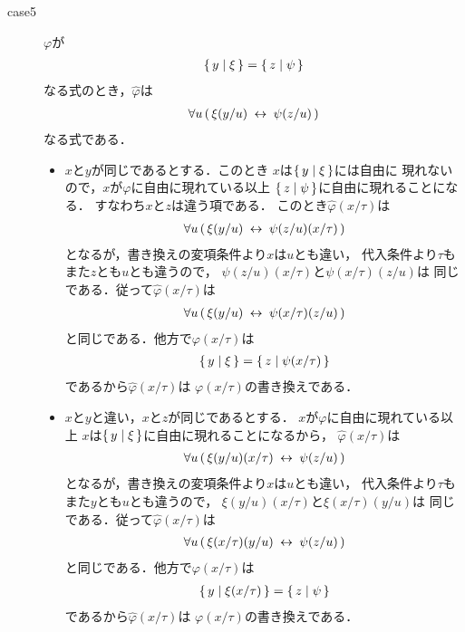 \begin{metaprf}[第一]
\begin{description}
\begin{description}
					\item[case5] $\varphi$が
						\begin{align}
							\{\, y \mid \xi\, \} = \{\, z \mid \psi\, \}
						\end{align}
						なる式のとき，$\widehat{\varphi}$は
						\begin{align}
							\forall u\, (\, \xi(y/u) \hspace{0.25em}\leftrightarrow\hspace{0.25em} \psi(z/u)\, )
						\end{align}
						なる式である．
						\begin{itemize}
							\item $x$と$y$が同じであるとする．このとき
								$x$は$\{\, y \mid \xi\, \}$には自由に
								現れないので，$x$が$\varphi$に自由に現れている以上
								$\{\, z \mid \psi\, \}$に自由に現れることになる．
								すなわち$x$と$z$は違う項である．
								このとき$\widehat{\varphi}(x/\tau)$は
								\begin{align}
									\forall u\, (\, \xi(y/u) \hspace{0.25em}\leftrightarrow\hspace{0.25em} \psi(z/u)(x/\tau)\, )
								\end{align}
								となるが，書き換えの変項条件より$x$は$u$とも違い，
								代入条件より$\tau$もまた$z$とも$u$とも違うので，
								$\psi(z/u)(x/\tau)$と$\psi(x/\tau)(z/u)$は
								同じである．従って$\widehat{\varphi}(x/\tau)$は
								\begin{align}
									\forall u\, (\, \xi(y/u) \hspace{0.25em}\leftrightarrow\hspace{0.25em} \psi(x/\tau)(z/u)\, )
								\end{align}
								と同じである．他方で$\varphi(x/\tau)$は
								\begin{align}
									\{\, y \mid \xi\, \} = \{\, z \mid \psi(x/\tau)\, \}
								\end{align}
								であるから$\widehat{\varphi}(x/\tau)$は
								$\varphi(x/\tau)$の書き換えである．
								
							\item $x$と$y$と違い，$x$と$z$が同じであるとする．
								$x$が$\varphi$に自由に現れている以上
								$x$は$\{\, y \mid \xi\, \}$に自由に現れることになるから，
								$\widehat{\varphi}(x/\tau)$は
								\begin{align}
									\forall u\, (\, \xi(y/u)(x/\tau) \hspace{0.25em}\leftrightarrow\hspace{0.25em} \psi(z/u)\, )
								\end{align}
								となるが，書き換えの変項条件より$x$は$u$とも違い，
								代入条件より$\tau$もまた$y$とも$u$とも違うので，
								$\xi(y/u)(x/\tau)$と$\xi(x/\tau)(y/u)$は
								同じである．従って$\widehat{\varphi}(x/\tau)$は
								\begin{align}
									\forall u\, (\, \xi(x/\tau)(y/u) \hspace{0.25em}\leftrightarrow\hspace{0.25em} \psi(z/u)\, )
								\end{align}
								と同じである．他方で$\varphi(x/\tau)$は
								\begin{align}
									\{\, y \mid \xi(x/\tau)\, \} = \{\, z \mid \psi\, \}
								\end{align}
								であるから$\widehat{\varphi}(x/\tau)$は
								$\varphi(x/\tau)$の書き換えである．
							

\end{itemize}
\end{description}
\end{description}
\end{metaprf}
